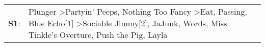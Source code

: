 \begin{supertabular}{p{0.03\textwidth}p{0.92\textwidth}}
 \textbf{S1}:  &  Plunger\textsuperscript{} \textgreater \enspace Partyin' Peeps\textsuperscript{}, \enspace Nothing Too Fancy\textsuperscript{} \textgreater \enspace Eat\textsuperscript{}, \enspace Passing\textsuperscript{}, \enspace Blue Echo[1]\textsuperscript{} \textgreater \enspace Sociable Jimmy[2]\textsuperscript{}, \enspace JaJunk\textsuperscript{}, \enspace Words\textsuperscript{}, \enspace Miss Tinkle's Overture\textsuperscript{}, \enspace Push the Pig\textsuperscript{}, \enspace Layla\textsuperscript{}  \enspace  \\
\end{supertabular}
